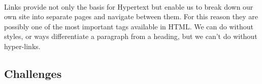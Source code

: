 \documentclass[10pt, a4paper]{article}
\begin{document}




\paragraph{} Links provide not only the basis for Hypertext but enable us to break down our own site into separate pages and navigate between them. For this reason they are possibly one of the most important tags available in HTML. We can do without styles, or ways differentiate a paragraph from a heading, but we can't do without hyper-links.

\subsection{Challenges}
\end{document}
